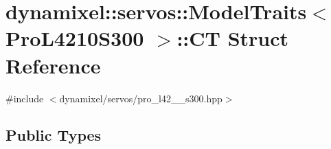\hypertarget{structdynamixel_1_1servos_1_1_model_traits_3_01_pro_l4210_s300_01_4_1_1_c_t}{}\section{dynamixel\+:\+:servos\+:\+:Model\+Traits$<$ Pro\+L4210\+S300 $>$\+:\+:C\+T Struct Reference}
\label{structdynamixel_1_1servos_1_1_model_traits_3_01_pro_l4210_s300_01_4_1_1_c_t}


{\ttfamily \#include $<$dynamixel/servos/pro\+\_\+l42\+\_\+\_\+s300.\+hpp$>$}

\subsection*{Public Types}
